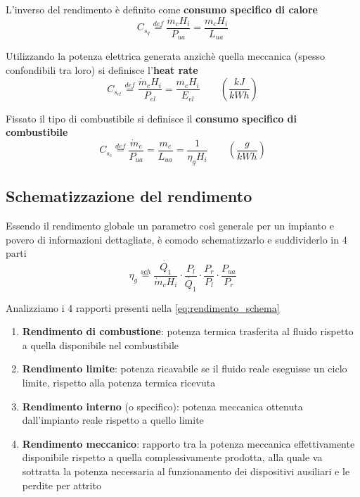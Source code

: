 \documentclass[a4paper,12pt]{article}
\begin{document}
L'inverso del rendimento è definito come \textbf{consumo specifico di calore}
\begin{equation}
	C_{s_q} \stackrel{def}{=} \frac{\dot{m}_c H_i}{P_{ua}} = \frac{m_c H_i}{L_{ua}}
\end{equation}

Utilizzando la {potenza elettrica} generata anzichè quella meccanica
(spesso confondibili tra loro) si definisce l'\textbf{heat rate}
\begin{equation}
 	C_{s_{el}} \stackrel{def}{=} \frac{\dot{m}_c H_i}{P_{el}} = \frac{m_c H_i}{E_{el}} 
 	\qquad\left(\frac{kJ}{kWh} \right)
\end{equation}

Fissato il tipo di combustibile si definisce il \textbf{consumo specifico di 
combustibile}
\begin{equation}
	C_{s_c} \stackrel{def}{=} \frac{\dot{m}_c}{P_{ua}} = \frac{m_c}{L_{ua}} = \frac{1}
	{\eta_gH_i} \qquad\left(\frac{g}{kWh} \right)
\end{equation}
\subsection*{Schematizzazione del rendimento}
\label{subsec:rendimento_schema}
Essendo il rendimento globale un parametro così generale per un impianto e povero
di informazioni dettagliate, è comodo schematizzarlo e suddividerlo in 4 parti
\begin{equation}
\label{eq:rendimento_schema}
 	\eta_g \stackrel{sch}{=} \frac{\dot{Q_1}}{\dot{m}_c H_i}\cdot \frac{P_l}{\dot{Q_1}}
	 \cdot \frac{P_r}{P_l}\cdot \frac{P_{ua}}{P_r}
\end{equation}

Analizziamo i 4 rapporti presenti nella \eqref{eq:rendimento_schema}
\begin{enumerate}
	\item \textbf{Rendimento di combustione}: potenza termica trasferita al fluido 
	rispetto a quella disponibile nel combustibile

	\item \textbf{Rendimento limite}:
	potenza ricavabile se il fluido reale eseguisse un ciclo limite, rispetto alla 
	potenza termica ricevuta

	\item \textbf{Rendimento interno} (o specifico): potenza meccanica ottenuta 
	dall'impianto reale rispetto a quello limite

    \item \textbf{Rendimento meccanico}: rapporto tra la potenza meccanica effettivamente 
    disponibile rispetto a quella complessivamente prodotta, alla quale va sottratta la 
    potenza necessaria al funzionamento dei dispositivi ausiliari e le perdite per 
    attrito
\end{enumerate}
\end{document}
